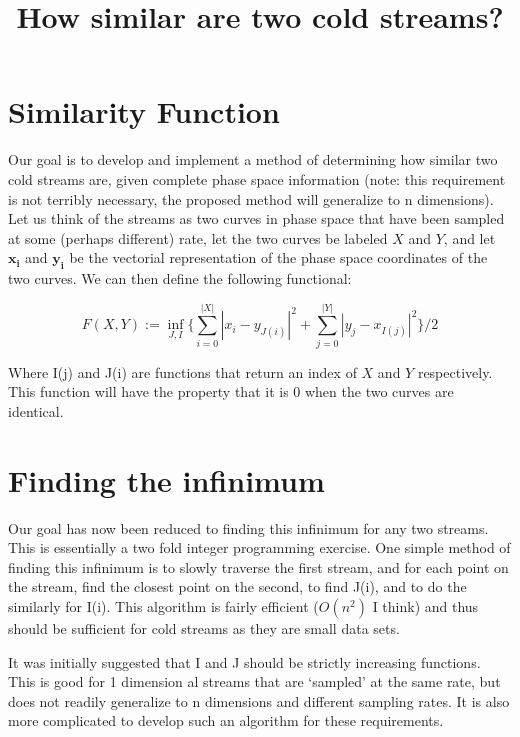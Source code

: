 \documentclass{article}
\begin{document}
\title{How similar are two cold streams?}
\maketitle
\section{Similarity Function}

Our goal is to develop and implement a method of determining how similar two cold streams are, given complete phase space information (note: this requirement is not terribly necessary, the proposed method will generalize to n dimensions). Let us think of the streams as two curves in phase space that have been sampled at some (perhaps different) rate, let the two curves be labeled $X$ and $Y$, and let $\mathbf{x_i}$ and $\mathbf{y_i}$ be the vectorial representation of the phase space coordinates of the two curves. We can then define the following functional:

\begin{equation}
F(X,Y) := \inf_{J, I}\{\sum_{i=0}^{|X|} |x_i -y_{J(i)}|^2 + \sum_{j=0}^{|Y|} |y_j - x_{I(j)}|^2\}/2
\end{equation}

Where I(j) and J(i) are functions that return an index of $X$ and $Y$ respectively. This function will have the property that it is 0 when the two curves are identical.

\section{Finding the infinimum}

Our goal has now been reduced to finding this infinimum for any two streams. This is essentially a two fold integer programming exercise. One simple method of finding this infinimum is to slowly traverse the first stream, and for each point on the stream, find the closest point on the second, to find J(i), and to do the similarly for I(i). This algorithm is fairly efficient ($O(n^2)$ I think) and thus should be sufficient for cold streams as they are small data sets. 

It was initially suggested that I and J should be strictly increasing functions. This is good for 1 dimension al streams that are `sampled' at the same rate, but does not readily generalize to n dimensions and different sampling rates. It is also more complicated to develop such an algorithm for these requirements.  
\end{document}
